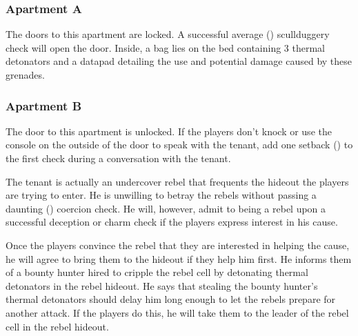 \documentclass[letterpaper]{article}
\begin{document}
\subsubsection{Apartment A}

\begin{minipage}[t]{0.6\textwidth}
    The doors to this apartment are locked. A successful average (\difficulty\difficulty) scullduggery check will open the door. Inside, a bag lies on the bed containing 3 thermal detonators and a datapad detailing the use and potential damage caused by these grenades.
\end{minipage}
\hfill
\begin{minipage}[t]{0.5\textwidth}
\end{minipage}

\subsubsection{Apartment B}

\begin{minipage}[t]{0.6\textwidth}
    The door to this apartment is unlocked. If the players don't knock or use the console on the outside of the door to speak with the tenant, add one setback (\setback) to the first check during a conversation with the tenant. 

    The tenant is actually an undercover rebel that frequents the hideout the players are trying to enter. He is unwilling to betray the rebels without passing a daunting (\difficulty\difficulty\difficulty\difficulty) coercion check. He will, however, admit to being a rebel upon a successful deception or charm check if the players express interest in his cause.

    Once the players convince the rebel that they are interested in helping the cause, he will agree to bring them to the hideout if they help him first. He informs them of a bounty hunter hired to cripple the rebel cell by detonating thermal detonators in the rebel hideout. He says that stealing the bounty hunter's thermal detonators should delay him long enough to let the rebels prepare for another attack. If the players do this, he will take them to the leader of the rebel cell in the rebel hideout.
\end{minipage}
\hfill
\begin{minipage}[t]{0.5\textwidth}
\end{minipage}
\linebreak
\end{document}
